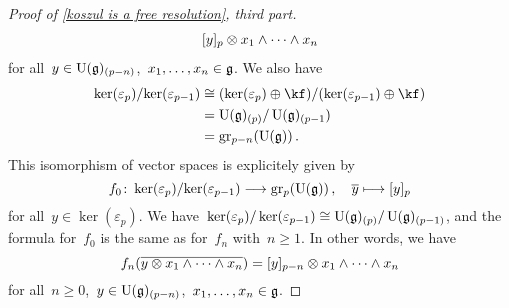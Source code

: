 \begin{proof}[Proof of \cref{koszul is a free resolution}, third part]
\begin{align*}
    \lbrack y \rbrack_p \otimes x_1 \wedge \dotsb \wedge x_n
  \end{align*}
  for all~$y \in \operatorname{U}(\mathfrak{g})_{(p-n)}$,~$x_1, \dotsc, x_n \in \mathfrak{g}$.
  We also have
  \begin{align*}
    \ker(\varepsilon_p)
    /
    {\ker(\varepsilon_{p-1})}
    &\cong
    (\ker(\varepsilon_p) \oplus \kf)
    /
    (\ker(\varepsilon_{p-1}) \oplus \kf)
    \\
    &=
    \Univ(\glie)_{(p)} / \Univ(\glie)_{(p-1})
    \\
    &=
    \gr[p-n]( \Univ(\glie) ) \,.
  \end{align*}
  This isomorphism of vector spaces is explicitely given by
  \[
    f_0
    \colon
    \ker(\varepsilon_p) / {\ker(\varepsilon_{p-1})}
    \to
    \gr[p]( \Univ(\glie) ) \,,
    \quad
    \class{y}
    \mapsto
    \fclass{ y }_p
  \]
  for all~$y \in \ker(\varepsilon_p)$.
  We have~$\ker(\varepsilon_p) / \ker(\varepsilon_{p-1}) \cong \operatorname{U}(\mathfrak{g})_{(p)} / \operatorname{U}(\mathfrak{g})_{(p-1)}$, and the formula for~$f_0$ is the same as for~$f_n$ with~$n \geq 1$.
  In other words, we have
  \[
    f_n( \overline{ y \otimes x_1 \wedge \dotsb \wedge x_n } )
    =
    \lbrack y \rbrack_{p-n} \otimes x_1 \wedge \dotsb \wedge x_n
  \]
  for all~$n \geq 0$,~$y \in \operatorname{U}(\mathfrak{g})_{(p-n)}$,~$x_1, \dotsc, x_n \in \mathfrak{g}$.


\end{proof}
